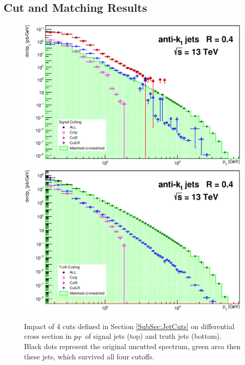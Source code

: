 \begin{appendices}

\chapter{Cut and Matching Results}
\label{App:CutAndMatchingResults}

\begin{figure}[p]
  \centering
  \includegraphics[width=\textwidth]{Chapter3/SignalCutting.eps}
  \includegraphics[width=\textwidth]{Chapter3/TruthCutting.eps}
  \caption{Impact of 4 cuts defined in Section \ref{SubSec:JetCuts} on
  differential cross section in $p_{T}$ of signal jets (top) and truth jets
  (bottom). Black dots represent the original uncutted spectrum, green area then
  these jets, which survived all four cutoffs.}
  \label{fig:Cutting}
\end{figure}


\end{appendices}
